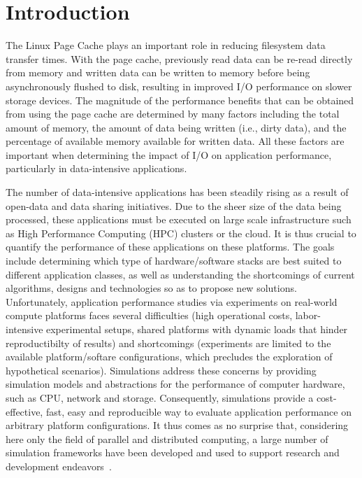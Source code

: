 \documentclass[conference]{IEEEtran}
\begin{document}
    \section{Introduction}

        The Linux Page Cache plays an important role in
        reducing filesystem data transfer times. With the page cache, previously
        read data can be re-read directly from memory and written data can be written to
        memory before being asynchronously flushed to disk, resulting in improved I/O performance
        on slower storage devices. The magnitude of the performance benefits that can be obtained from using the page
        cache are determined by many factors including the total amount of memory,
        the amount of data being written (i.e., dirty data), and the percentage of available memory available for
        written data. All these factors are important when determining the impact of I/O on
        application performance, particularly in data-intensive applications.

        The number of data-intensive applications has been steadily rising as a result of
        open-data and data sharing initiatives. Due to the sheer size of the data being
        processed, these applications must be executed on large scale infrastructure
	such as High Performance Computing (HPC) clusters or the cloud.  It
	is thus crucial to quantify the performance of these applications
	on these platforms. The goals include determining which type of hardware/software
	stacks are best suited to different application classes, as well as
	understanding the shortcomings of current algorithms, designs and
	technologies so as to propose new solutions. Unfortunately, application performance
        studies via experiments on real-world compute platforms
        faces several difficulties (high operational costs, labor-intensive experimental setups,
        shared platforms with dynamic loads that hinder reproductibilty of results) and shortcomings
        (experiments are limited to the available platform/softare configurations, which precludes
        the exploration of hypothetical scenarios). 
	Simulations address these concerns by providing simulation models
	and abstractions for the performance of computer hardware, such as
	CPU, network and storage. Consequently, simulations provide a
	cost-effective, fast, easy and reproducible way to evaluate
	application performance on arbitrary platform configurations. It thus comes
        as no surprise that, considering here only the field of parallel and distributed
        computing, a large number of simulation frameworks have been developed and used
        to support research and development endeavors~\cite{LAUNDRYLISTOFREFS_THAT_HENRI_WILL_PUT_IN}.
\end{document}
